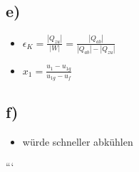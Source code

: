 

\subsection*{e)}
\begin{itemize}
    \item $\epsilon_K = \frac{|Q_{zu}|}{|W|} = \frac{|Q_{ab}|}{|Q_{ab}| - |Q_{zu}|}$
    \item $x_1 = \frac{u_1 - u_{1g}}{u_{1g} - u_f}$
\end{itemize}

\subsection*{f)}
\begin{itemize}
    \item würde schneller abkühlen
\end{itemize}

```